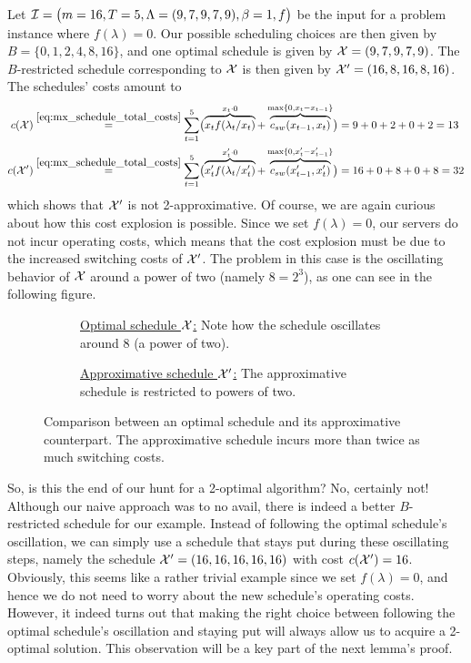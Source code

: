 \begin{exmpl}\label{exmpl:oscillating_schedule}
Let $\mathcal{I}=\bigl(m=16,T=5,\Lambda=(9,7,9,7,9),\beta=1,f\bigr)$ be the input for a problem instance where $f(\lambda)=0$. Our possible scheduling choices are then given by $B=\{0,1,2,4,8,16\}$, and one optimal schedule is given by $\mathcal{X}=(9,7,9,7,9)$. The $B$-restricted schedule corresponding to $\mathcal{X}$ is then given by $\mathcal{X}'=(16,8,16,8,16)$. The schedules' costs amount to
\begin{align*}
	c(\mathcal{X})&\stackrel{\eqref{eq:mx_schedule_total_costs}}{=}\sum\limits_{t=1}^{5}\bigl(\overbrace{x_tf(\lambda_t/x_t)}^{x_t\cdot 0}+\overbrace{c_{sw}(x_{t-1},x_t)}^{\max\{0,x_t-x_{t-1}\}}\bigr)=9+0+2+0+2=13\\
	c(\mathcal{X}')&\stackrel{\eqref{eq:mx_schedule_total_costs}}{=}\sum\limits_{t=1}^{5}\bigl(\overbrace{x_t'f(\lambda_t/x_t')}^{x_t'\cdot 0}+\overbrace{c_{sw}(x_{t-1}',x_t')}^{\max\{0,x_t'-x_{t-1}'\}}\bigr)=16+0+8+0+8=32
\end{align*}
which shows that $\mathcal{X}'$ is not 2-approximative. Of course, we are again curious about how this cost explosion is possible. Since we set $f(\lambda)=0$, our servers do not incur operating costs, which means that the cost explosion must be due to the increased switching costs of $\mathcal{X}'$. The problem in this case is the oscillating behavior of $\mathcal{X}$ around a power of two (namely $8=2^3$), as one can see in the following figure. 
\begin{figure}[H]
\captionsetup[subfigure]{labelformat=empty}
\begin{subfigure}[b]{0.48\textwidth}

	\caption{\underline{Optimal schedule $\mathcal{X}$:} Note how the schedule oscillates around 8 (a power of two).}
\end{subfigure}
\hfill
\begin{subfigure}[b]{0.48\textwidth}

	\caption{\underline{Approximative schedule $\mathcal{X}'$:} The approximative schedule is restricted to powers of two.}
\end{subfigure}
\caption{Comparison between an optimal schedule and its approximative counterpart. The approximative schedule incurs more than twice as much switching costs.}
\label{fig:adaption-schedule}
\end{figure}
\end{exmpl}
So, is this the end of our hunt for a 2-optimal algorithm? No, certainly not! Although our naive approach was to no avail, there is indeed a better $B$-restricted schedule for our example. Instead of following the optimal schedule's oscillation, we can simply use a schedule that stays put during these oscillating steps, namely the schedule $\mathcal{X}'=(16,16,16,16,16)$ with cost $c(\mathcal{X}')=16$. Obviously, this seems like a rather trivial example since we set $f(\lambda)=0$, and hence we do not need to worry about the new schedule's operating costs. However, it indeed turns out that making the right choice between following the optimal schedule's oscillation and staying put will always allow us to acquire a 2-optimal solution. This observation will be a key part of the next lemma's proof. 

